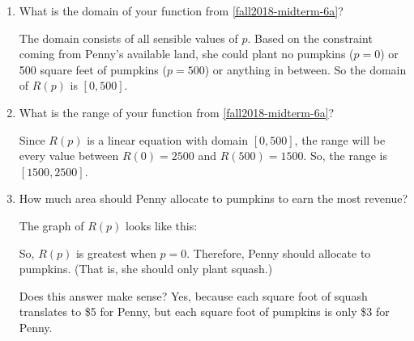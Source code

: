\documentclass{article}
\providecommand{\check}{}
\renewcommand{\check}{\ifmmode{\text{ \ding{51} }}\else{\ding{51} }\fi}
\newenvironment{checkanswer}{\color{checkcolor}\check}{\color{black}}
\theoremstyle{theorem}
\begin{document}
\begin{enumerate}
\begin{enumerate}
  \item
    \begin{problem}[\vfill]
      What is the domain of your function from \ref{fall2018-midterm-6a}?
    \end{problem}

    \begin{solution}
      The domain consists of all sensible values of $p$. Based on the constraint coming from Penny's available land, she could plant no pumpkins ($p=0$) or 500 square feet of pumpkins ($p=500$) or anything in between. So the domain of $R(p)$ is $\boxed{[0, 500]}$.
    \end{solution}

  \item
    \begin{problem}[\vfill]
      What is the range of your function from \ref{fall2018-midterm-6a}?
    \end{problem}

    \begin{solution}
      Since $R(p)$ is a linear equation with domain $[0, 500]$, the range will be every value between $R(0)=2500$ and $R(500)=1500$. So, the range is $\boxed{[1500, 2500]}$.
    \end{solution}

  \item
    \begin{problem}[\vfill\newpage]
      How much area should Penny allocate to pumpkins to earn the most revenue? 
    \end{problem}

    \begin{solution}
      The graph of $R(p)$ looks like this:
      \begin{center}
      \end{center}
      So, $R(p)$ is greatest when $p = 0$. Therefore, Penny should allocate  to pumpkins. (That is, she should only plant squash.)  

      \begin{checkanswer}
        Does this answer make sense? Yes, because each square foot of squash translates to \$5 for Penny, but each square foot of pumpkins is only \$3 for Penny.
      \end{checkanswer}
    \end{solution}
  \end{enumerate}


\end{enumerate}
\end{document}
